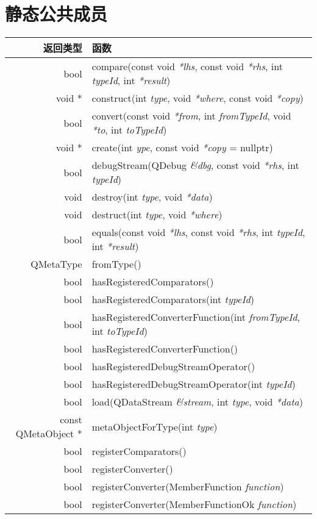 \section{静态公共成员}

\begin{longtable}[l]{|r|m{28em}|}   
\hline
返回类型 	& 函数 \\
\hline
bool	& compare(const void \emph{*lhs}, const void \emph{*rhs}, int \emph{typeId}, int \emph{*result})\\
\hline
void *	&construct(int \emph{type}, void \emph{*where}, const void \emph{*copy})\\
\hline
bool	& convert(const void \emph{*from}, int \emph{fromTypeId}, void \emph{*to}, int \emph{toTypeId})\\
\hline
void *	& create(int \emph{ype}, const void \emph{*copy} = nullptr)\\
\hline
bool	& debugStream(QDebug \emph{\&dbg}, const void \emph{*rhs}, int \emph{typeId})\\
\hline
void	& destroy(int \emph{type}, void \emph{*data})\\
\hline
void	& destruct(int \emph{type}, void \emph{*where})\\
\hline
bool	&equals(const void \emph{*lhs}, const void \emph{*rhs}, int \emph{typeId}, int \emph{*result})\\
\hline
QMetaType&	fromType()\\
\hline
bool	& hasRegisteredComparators()\\
\hline
bool	& hasRegisteredComparators(int \emph{typeId})\\
\hline
bool	&hasRegisteredConverterFunction(int \emph{fromTypeId}, int \emph{toTypeId})\\
\hline
bool	&hasRegisteredConverterFunction()\\
\hline
bool	&hasRegisteredDebugStreamOperator()\\
\hline
bool	&hasRegisteredDebugStreamOperator(int \emph{typeId})\\
\hline
bool	&load(QDataStream  \emph{\&stream}, int  \emph{type}, void \emph{*data})\\
\hline
const QMetaObject *&	metaObjectForType(int \emph{type})\\
\hline
bool&	registerComparators()\\
\hline
bool&	registerConverter()\\
\hline
bool&	registerConverter(MemberFunction \emph{function})\\
\hline
bool&	registerConverter(MemberFunctionOk \emph{function})\\

\end{longtable}
